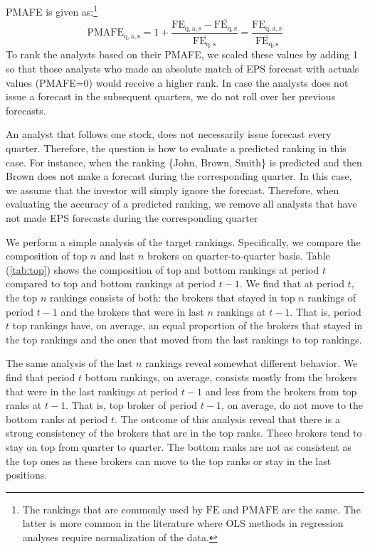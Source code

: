 \documentclass{article}\usepackage[]{graphicx}\usepackage[]{color}
\begin{document}
PMAFE is given as:\footnote{The rankings that are commonly used by $\mathrm{FE}$ and $\mathrm{PMAFE}$ are the same. The latter is more common in the literature where OLS methods in regression analyses require normalization of the data.}
\begin{equation}
\mathrm{PMAFE_{q,a,s}}=1+\frac{\mathrm{FE_{q,a,s}}-\mathrm{\overline{FE_{q,s}}}}{\mathrm{\overline{FE_{q,s}}}}=\frac{\mathrm{FE_{q,a,s}}}{\mathrm{\overline{FE_{q,s}}}}
\end{equation}
To rank the analysts based on their PMAFE, we scaled these values by adding 1 so that those analysts who made an absolute match of EPS forecast with actuals values (PMAFE=0) would receive a higher rank. In case the analysts does not issue a forecast in the subsequent quarters, we do not roll over her previous forecasts. 

An analyst that follows one stock, does not necessarily issue forecast every quarter. Therefore, the question is how to evaluate a predicted ranking in this case. For instance, when the ranking \{John, Brown, Smith\} is predicted and then Brown does not make a forecast during the corresponding quarter. In this case, we assume that the investor will simply ignore the forecast. Therefore, when evaluating the accuracy of a predicted ranking, we remove all analysts that have not made EPS forecasts during the corresponding quarter

We perform a simple analysis of the target rankings. Specifically, we compare the composition of top $n$ and last $n$ brokers on quarter-to-quarter basis. Table (\ref{tab:top}) shows the composition of top and bottom rankings at period $t$ 
compared to top and bottom rankings at period $t-1$.  We find that at period $t$, the top $n$ rankings consists of both: the  brokers that stayed in top $n$ rankings of period $t-1$  and the brokers that were in last $n$ rankings at $t-1$. That is, period $t$ top rankings have, on average, an equal proportion of the brokers that stayed in the top rankings and the ones that moved from the last rankings to top rankings.

The same analysis of the last $n$ rankings reveal somewhat different behavior. We find that period $t$ bottom rankings,  on average, consists mostly from the brokers that were in the last rankings at period $t-1$ and less from the brokers from top ranks at $t-1$. That is, top broker of period $t-1$, on average, do not move to the bottom ranks at period $t$. The outcome of this analysis reveal that there is a strong consistency of the brokers that are in the top ranks. These brokers tend to stay on top from quarter to quarter. The bottom ranks are not as consistent as the top ones as these brokers can move to the top ranks or stay in the last positions. 
\end{document}

